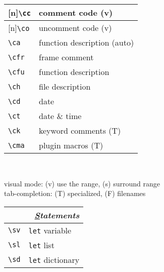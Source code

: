 \documentclass[oneside,10pt,landscape,DIV16]{scrartcl}
\newcommand{\Rep}{{\scriptsize{[n]}}}
\begin{document}
\begin{multicols}{3}
\begin{center}
\begin{tabular}[]{|p{11mm}|p{58mm}|}
\hline \Rep\verb'\cc'   & comment code                      \hfill (v)\\
\hline \Rep\verb'\co'   & uncomment code                    \hfill (v)\\
\hline     \verb'\ca'   & function description (auto)       \\
%
\hline     \verb'\cfr'  & frame comment                     \\
\hline     \verb'\cfu'  & function description              \\
\hline     \verb'\ch'   & file description                  \\
\hline     \verb'\cd'   & date                              \\
\hline     \verb'\ct'   & date \& time                      \\
\hline
%
\hline     \verb'\ck'   & keyword comments                  \hfill (T)\\
\hline     \verb'\cma'  & plugin macros                     \hfill (T)\\
\hline
\end{tabular}\\[1.0ex]
%
\begin{minipage}[b]{72mm}%
\scriptsize{%
visual mode: {\normalsize (v)} use the range,
{\normalsize (s)} surround range \\
tab-completion: {\normalsize (T)} specialized,
{\normalsize (F)} filenames
}%
\end{minipage}
%
%
\begin{tabular}[]{|p{11mm}|p{58mm}|}
\hline
\multicolumn{2}{|r|}{\textsl{\underline{S}tatements}}\\[1.0ex]
\hline \verb'\sv'     & \verb'let' variable                              \\
\hline \verb'\sl'     & \verb'let' list                                  \\
\hline \verb'\sd'     & \verb'let' dictionary                            \\

\end{tabular}
\end{center}
\end{multicols}
\end{document}
